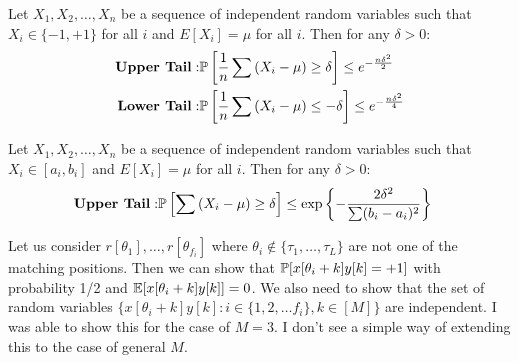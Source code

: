 \appendices

\begin{lemma}
\label{Lem:Chernoff}
Let $X_1, X_2,\ldots, X_n$ be a sequence of independent random variables such that $X_i \in\{-1, +1\}$ for all $i$ and $E[X_i]=\mu$ for all $i$. Then for any $\delta>0$:
\begin{align*}
\text{\textbf{Upper Tail}}: &\mathbb{P}\left[\frac{1}{n}\sum \left(X_i-\mu\right)\geq \delta\right]\leq e^{-\frac{n\delta^2}{2}}\\
\textbf{Lower Tail}: &\mathbb{P}\left[\frac{1}{n}\sum \left(X_i-\mu\right)\leq -\delta\right]\leq e^{-\frac{n\delta^2}{4}}
\end{align*}
\end{lemma}

\begin{lemma}
\label{Lem:Chernoff2}
Let $X_1, X_2,\ldots, X_n$ be a sequence of independent random variables such that $X_i \in[a_i, b_i]$ and $E[X_i]=\mu$ for all $i$. Then for any $\delta>0$:
\begin{align*}
\text{\textbf{Upper Tail}}: &\mathbb{P}\left[\sum \left(X_i-\mu\right)\geq \delta\right]\leq \exp\left\lbrace-\frac{2\delta^2}{\sum(b_i-a_i)^2}\right\rbrace
\end{align*}
\end{lemma}

\begin{remark}
\label{Lem:CorrelationCoefficient}
Let us consider $r[\theta_1],\ldots ,r[\theta_{f_i}]$ where $\theta_i \notin \{\tau_1,\ldots, \tau_L\}$ are not one of the matching positions. Then we can show that $\mathbb{P}[x[\theta_i+k]y[k]=+1]$ with probability 1/2 and $\mathbb{E}[x[\theta_i+k]y[k]]=0$. We also need to show that  the set of random variables  $\{x[\theta_i+k]y[k]: i\in\{1,2,\ldots f_i\},k\in[M]\}$ are independent. I was able to show this for the case of $M=3$. I don't see a simple way of extending this to the case of general $M$.
\end{remark}

